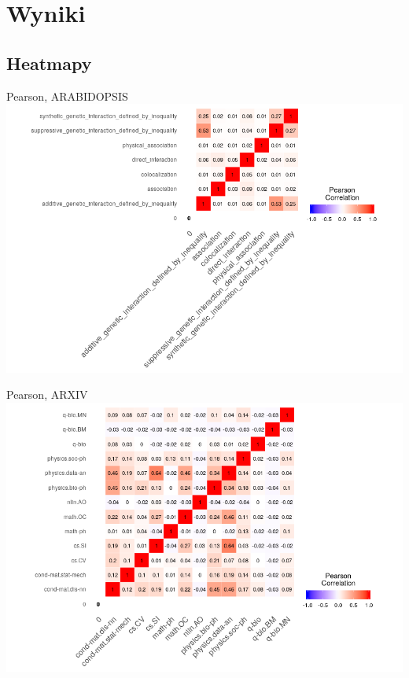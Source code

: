 \documentclass{beamer}
\begin{document}
\section{Wyniki}
\subsection{Heatmapy}
\begin{frame}{Pearson, ARABIDOPSIS} 
\includegraphics[scale=0.46]{heamapPearson1}
\end{frame}
\begin{frame}{Pearson, ARXIV} 
\includegraphics[scale=0.46]{heamapPearson2}
\end{frame}
\end{document}
